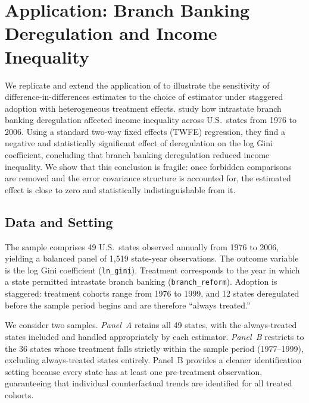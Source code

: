 %

\section{Application: Branch Banking Deregulation and Income Inequality}
\label{sec:application}

We replicate and extend the application of \citet{beck2010} to illustrate
the sensitivity of difference-in-differences estimates to the choice of
estimator under staggered adoption with heterogeneous treatment effects.
\citet{beck2010} study how intrastate branch banking deregulation affected
income inequality across U.S.\ states from 1976 to 2006. Using a standard
two-way fixed effects (TWFE) regression, they find a negative and
statistically significant effect of deregulation on the log Gini
coefficient, concluding that branch banking deregulation reduced income
inequality. We show that this conclusion is fragile: once forbidden
comparisons are removed and the error covariance structure is accounted
for, the estimated effect is close to zero and statistically
indistinguishable from it.

\subsection{Data and Setting}

The sample comprises 49 U.S.\ states observed annually from 1976 to 2006,
yielding a balanced panel of 1{,}519 state-year observations. The outcome
variable is the log Gini coefficient (\texttt{ln\_gini}). Treatment
corresponds to the year in which a state permitted intrastate branch
banking (\texttt{branch\_reform}). Adoption is staggered: treatment cohorts
range from 1976 to 1999, and 12 states deregulated before the sample
period begins and are therefore ``always treated.''

We consider two samples. \textit{Panel~A} retains all 49 states, with
the always-treated states included and handled appropriately by each
estimator. \textit{Panel~B} restricts to the 36 states whose treatment
falls strictly within the sample period (1977--1999), excluding
always-treated states entirely. Panel~B provides a cleaner identification
setting because every state has at least one pre-treatment observation,
guaranteeing that individual counterfactual trends are identified for all
treated cohorts.

